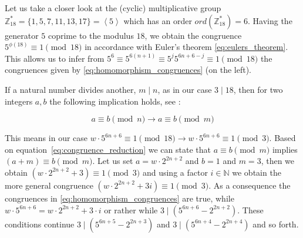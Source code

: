 
Let us take a closer look at the (cyclic) multiplicative group $\mathbb{Z}^\ast_{18}=\{1,5,7,11,13,17\}=\left<5\right>$ which has an order $ord(\mathbb{Z}^\ast_{18})=6$. Having the generator $5$ coprime to the modulus $18$, we obtain the congruence $5^{\phi(18)}\equiv1\pmod{18}$ in accordance with Euler's theorem \ref{eq:eulers_theorem}. This allows us to infer from $5^6\equiv5^{6(n+1)}\equiv5^j5^{6n+6-j}\equiv1\pmod{18}$ the congruences given by \ref{eq:homomorphism_congruences} (on the left).

If a natural number divides another, $m\mid n$, as in our case $3\mid18$, then for two integers $a,b$ the following implication holds, see \cite[p.~21]{Ref_Mueller-Stach_2011}:

\begin{equation}
	\label{eq:reduce_modulus}
	a\equiv b\pmod n\rightarrow a\equiv b\pmod m
\end{equation}

This means in our case $w\cdot5^{6n+6}\equiv 1\pmod{18}\rightarrow w\cdot5^{6n+6}\equiv 1\pmod 3$. Based on equation~\ref{eq:congruence_reduction} we can state that $a\equiv b\pmod m$ implies $(a+m)\equiv b\pmod m$. Let us set $a=w\cdot2^{2n+2}$ and $b=1$ and $m=3$, then we obtain $(w\cdot2^{2n+2}+3)\equiv1\pmod3$ and using a factor $i\in\mathbb{N}$ we obtain the more general congruence $(w\cdot2^{2n+2}+3i)\equiv1\pmod3$. As a consequence the congruences in \ref{eq:homomorphism_congruences} are true, while $w\cdot5^{6n+6}=w\cdot2^{2n+2}+3\cdot i$ or rather while $3\mid(5^{6n+6}-2^{2n+2})$. These conditions continue $3\mid(5^{6n+5}-2^{2n+3})$ and $3\mid(5^{6n+4}-2^{2n+4})$ and so forth.

